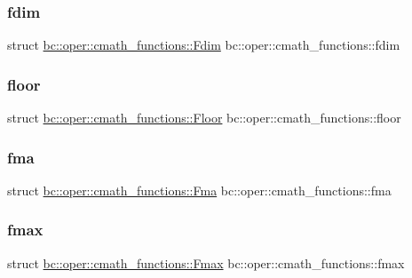 \subsubsection{\texorpdfstring{fdim}{fdim}}
{\footnotesize\ttfamily struct \hyperlink{structbc_1_1oper_1_1cmath__functions_1_1Fdim}{bc\+::oper\+::cmath\+\_\+functions\+::\+Fdim}   bc\+::oper\+::cmath\+\_\+functions\+::fdim}

\mbox{\label{namespacebc_1_1oper_1_1cmath__functions_a61b5a3028e62fafc1bced966724253f5}} 
\subsubsection{\texorpdfstring{floor}{floor}}
{\footnotesize\ttfamily struct \hyperlink{structbc_1_1oper_1_1cmath__functions_1_1Floor}{bc\+::oper\+::cmath\+\_\+functions\+::\+Floor}   bc\+::oper\+::cmath\+\_\+functions\+::floor}

\mbox{\label{namespacebc_1_1oper_1_1cmath__functions_a578a1881628b2fc3eb7df2fbbda8778d}} 
\subsubsection{\texorpdfstring{fma}{fma}}
{\footnotesize\ttfamily struct \hyperlink{structbc_1_1oper_1_1cmath__functions_1_1Fma}{bc\+::oper\+::cmath\+\_\+functions\+::\+Fma}   bc\+::oper\+::cmath\+\_\+functions\+::fma}

\mbox{\label{namespacebc_1_1oper_1_1cmath__functions_a6037d4bf232eb4984507126102c603d6}} 
\subsubsection{\texorpdfstring{fmax}{fmax}}
{\footnotesize\ttfamily struct \hyperlink{structbc_1_1oper_1_1cmath__functions_1_1Fmax}{bc\+::oper\+::cmath\+\_\+functions\+::\+Fmax}   bc\+::oper\+::cmath\+\_\+functions\+::fmax}

